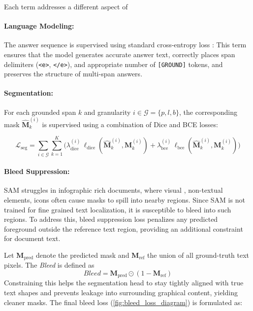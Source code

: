 \noindent Each term addresses a different aspect of \modelName\

\paragraph{Language Modeling:}
The answer sequence is supervised using standard cross-entropy loss \cite{rumelhart1986learning_cross_entropy_loss}:
This term ensures that the model generates accurate answer text, correctly places span delimiters (\texttt{<e>}, \texttt{</e>}), and appropriate number of \texttt{[GROUND]} tokens, and preserves the structure of multi-span answers. 

\paragraph{Segmentation:}
For each grounded span $k$ and granularity $i \in \mathcal{G}=\{p,l,b\}$, the corresponding mask $\hat{\mathbf{M}}^{(i)}_k$ is supervised using a combination of Dice \cite{milletari2016v_dice_loss} and BCE \cite{rumelhart1986learning_cross_entropy_loss} losses:

\[
\mathcal{L}_{\mathrm{seg}} = 
\sum_{i\in\mathcal{G}} \sum_{k=1}^{K}
\Big(
\lambda_{\mathrm{dice}}^{(i)}\,\ell_{\mathrm{dice}}(\hat{\mathbf{M}}_k^{(i)},\mathbf{M}_k^{(i)})
+
\lambda_{\mathrm{bce}}^{(i)}\,\ell_{\mathrm{bce}}(\hat{\mathbf{M}}_k^{(i)},\mathbf{M}_k^{(i)})
\Big)
\]

\paragraph{Bleed Suppression:}
SAM struggles in infographic rich documents, where visual , non-textual elements, icons often cause masks to spill into nearby regions. Since SAM is not trained for fine grained text localization, it is susceptible to bleed into such regions. To address this, bleed suppression loss penalizes any predicted foreground outside the reference text region, providing an additional constraint for document text.

\noindent Let $\mathbf{M}_{\mathrm{pred}}$ denote the predicted mask and $\mathbf{M}_{\mathrm{ref}}$ the union of all ground-truth text pixels. The \textit{Bleed} is defined as
\[
\textit{Bleed}
= \mathbf{M}_{\mathrm{pred}} \odot \left(1 - \mathbf{M}_{\mathrm{ref}}\right) 
\]
 Constraining this helps the segmentation head to stay tightly aligned with true text shapes and prevents leakage into surrounding graphical content, yielding cleaner masks. The final bleed loss (\cref{fig:bleed_loss_diagram}) is formulated as:


